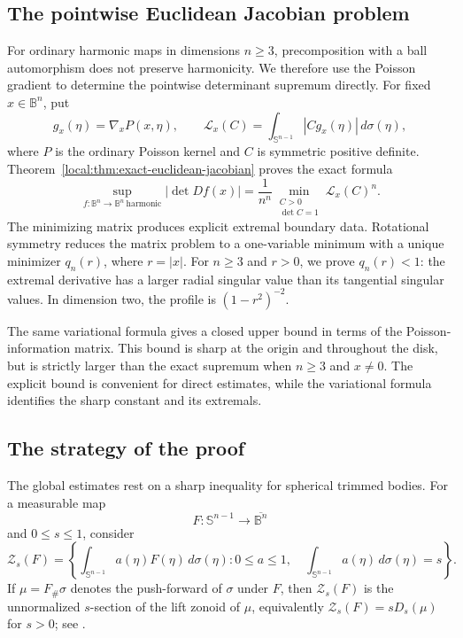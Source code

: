 \documentclass[11pt,reqno]{amsart}
\theoremstyle{remark}
\begin{document}
\subsection{The pointwise Euclidean Jacobian problem}

For ordinary harmonic maps in dimensions $n\ge3$, precomposition with a
ball automorphism does not preserve harmonicity.  We therefore use the
Poisson gradient to determine the pointwise determinant supremum directly.
For fixed $x\in\mathbb B^n$, put
\[
 g_x(\eta)=\nabla_xP(x,\eta),\qquad
 \mathcal L_x(C)=\int_{\mathbb S^{n-1}}|Cg_x(\eta)|\,d\sigma(\eta),
\]
where $P$ is the ordinary Poisson kernel and $C$ is symmetric positive definite.
Theorem~\ref{local:thm:exact-euclidean-jacobian} proves the exact formula
\[
 \sup_{f:\mathbb B^n\to\mathbb B^n\ \mathrm{harmonic}}|\det Df(x)|
 =\frac1{n^n}\min_{\substack{C>0\\\det C=1}}\mathcal L_x(C)^n.
\]
The minimizing matrix produces explicit extremal boundary data.
Rotational symmetry reduces the matrix problem to a one-variable minimum
with a unique minimizer $q_n(r)$, where $r=|x|$.
For $n\ge3$ and $r>0$, we prove $q_n(r)<1$: the extremal derivative has
a larger radial singular value than its tangential singular values.
In dimension two, the profile is $(1-r^2)^{-2}$.

The same variational formula gives a closed upper bound in terms of the
Poisson-information matrix.  This bound is sharp at the origin and
throughout the disk, but is strictly larger than the exact supremum when
$n\ge3$ and $x\ne0$.  The explicit bound is convenient for direct estimates, while the
variational formula identifies the sharp constant and its extremals.

\subsection{The strategy of the proof}

The global estimates rest on a sharp inequality for spherical trimmed bodies.
For a measurable map
\[
 F:\mathbb S^{n-1}\to\overline{\mathbb B^n}
\]
and $0\le s\le1$, consider
\[
 \mathcal Z_s(F)
 =
 \left\{
 \int_{\mathbb S^{n-1}}a(\eta)F(\eta)\,d\sigma(\eta):
 0\le a\le1,\quad \int_{\mathbb S^{n-1}} a(\eta)\,d\sigma(\eta)=s
 \right\}.
\]
If $\mu=F_{\#}\sigma$ denotes the push-forward of $\sigma$ under $F$, then
$\mathcal Z_s(F)$ is the unnormalized $s$-section of the lift zonoid of
$\mu$, equivalently $\mathcal Z_s(F)=sD_s(\mu)$ for $s>0$;
see \cite[Sec.~2, Def.~1.1., Def.~2.1 and Prop.~2.2, pp.~1999--2002]{KoshevoyMosler1997}.
\end{document}
